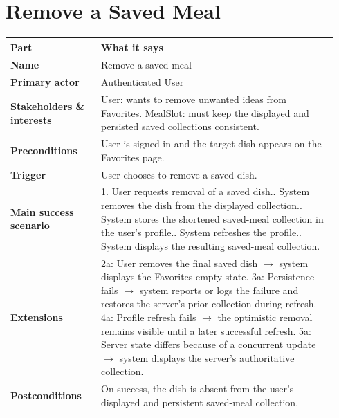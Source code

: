 \documentclass[11pt,twocolumn]{article}
\newcommand{\ucheader}{%
\textbf{Part} & \textbf{What it says} \\
\hline
\endhead
\hline
\endfoot
}
\begin{document}
\section{Remove a Saved Meal}
{\footnotesize
\begin{longtable}{@{}p{0.26\linewidth}p{0.68\linewidth}@{}}
\hline
\ucheader
\textbf{Name} & Remove a saved meal \\
\hline
\textbf{Primary actor} & Authenticated User \\
\hline
\textbf{Stakeholders \& interests} & User: wants to remove unwanted ideas from Favorites. MealSlot: must keep the displayed and persisted saved collections consistent. \\
\hline
\textbf{Preconditions} & User is signed in and the target dish appears on the Favorites page. \\
\hline
\textbf{Trigger} & User chooses to remove a saved dish. \\
\hline
\textbf{Main success scenario} & 1. User requests removal of a saved dish.\newline
2. System removes the dish from the displayed collection.\newline
3. System stores the shortened saved-meal collection in the user's profile.\newline
4. System refreshes the profile.\newline
5. System displays the resulting saved-meal collection. \\
\hline
\textbf{Extensions} & 2a: User removes the final saved dish $\rightarrow$ system displays the Favorites empty state.\newline
3a: Persistence fails $\rightarrow$ system reports or logs the failure and restores the server's prior collection during refresh.\newline
4a: Profile refresh fails $\rightarrow$ the optimistic removal remains visible until a later successful refresh.\newline
5a: Server state differs because of a concurrent update $\rightarrow$ system displays the server's authoritative collection. \\
\hline
\textbf{Postconditions} & On success, the dish is absent from the user's displayed and persistent saved-meal collection. \\
\hline
\end{longtable}
}
\end{document}
